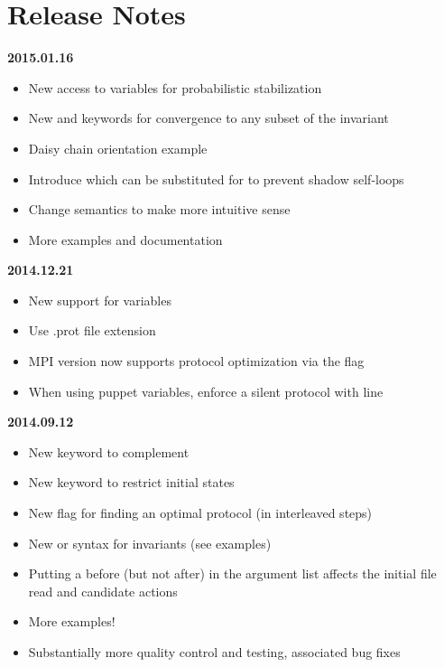 
\section{Release Notes}

\textbf{2015.01.16}
\begin{itemize}
\item New  access to variables for probabilistic stabilization
\item New  and  keywords for convergence to any subset of the invariant
\item Daisy chain orientation example
\end{itemize}
\begin{itemize}
\item Introduce  which can be substituted for  to prevent shadow self-loops
\item Change  semantics to make more intuitive sense
\item More examples and documentation
\end{itemize}
\textbf{2014.12.21}
\begin{itemize}
\item New support for  variables
\item Use .prot file extension
\item MPI version now supports protocol optimization via the  flag
\item When using puppet variables, enforce a silent protocol with  line
\end{itemize}
\textbf{2014.09.12}
\begin{itemize}
\item New  keyword to complement 
\item New  keyword to restrict initial states
\item New  flag for finding an optimal protocol (in interleaved steps)
\item New  or  syntax for invariants (see examples)
\item Putting a  before (but not after)  in the argument list affects the initial file read and candidate actions
\item More examples!
\item Substantially more quality control and testing, associated bug fixes
\end{itemize}

